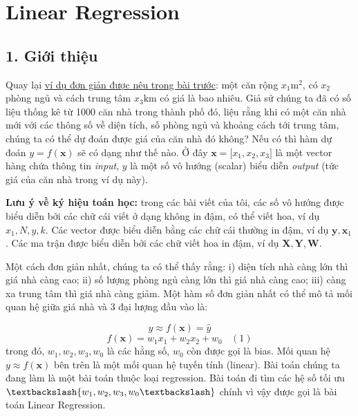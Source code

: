 \chapter{Linear Regression}
\label{cha:linearregression}

\section{1. Giới thiệu}\label{giux1edbi-thiux1ec7u}

Quay lại \href{/2016/12/27/categories/\#regression}{ví dụ đơn giản được
nêu trong bài trước}: một căn rộng $x_1 \text{m}^2$, có
$x_2$ phòng ngủ và cách trung tâm $ x_3 \text{km}$ có
giá là bao nhiêu. Giả sử chúng ta đã có số liệu thống kê từ 1000 căn nhà
trong thành phố đó, liệu rằng khi có một căn nhà mới với các thông số về
diện tích, số phòng ngủ và khoảng cách tới trung tâm, chúng ta có thể dự
đoán được giá của căn nhà đó không? Nếu có thì hàm dự đoán
$y = f(\mathbf{x}) $ sẽ có dạng như thế
nào. Ở đây $\mathbf{x} = {[}x_1, x_2, x_3{]}
$ là một vector hàng chứa thông tin \emph{input},
$y$ là một số vô hướng (scalar) biểu
diễn \emph{output} (tức giá của căn nhà trong ví dụ này).

\textbf{Lưu ý về ký hiệu toán học:} trong các bài viết của tôi, các số
vô hướng được biểu diễn bởi các chữ cái viết ở dạng không in đậm, có thể
viết hoa, ví dụ $x_1, N, y, k$. Các
vector được biểu diễn bằng các chữ cái thường in đậm, ví dụ
$\mathbf{y}, \mathbf{x}_1 $. Các ma
trận được biểu diễn bởi các chữ viết hoa in đậm, ví dụ
$\mathbf{X, Y, W} $.

Một cách đơn giản nhất, chúng ta có thể thấy rằng: i) diện tích nhà càng
lớn thì giá nhà càng cao; ii) số lượng phòng ngủ càng lớn thì giá nhà
càng cao; iii) càng xa trung tâm thì giá nhà càng giảm. Một hàm số đơn
giản nhất có thể mô tả mối quan hệ giữa giá nhà và 3 đại lượng đầu vào
là:

\begin{equation}y \approx  f(\mathbf{x}) = \hat{y}\end{equation}
\begin{equation}f(\mathbf{x}) =w_1 x_1 + w_2 x_2 + w_0~~~~
(1)\end{equation} trong đó, $w_1, w_2, w_3,
w_0$ là các hằng số,
$w_0$ còn được gọi là bias. Mối quan hệ
$y \approx f(\mathbf{x})$ bên trên là
một mối quan hệ tuyến tính (linear). Bài toán chúng ta đang làm là một
bài toán thuộc loại regression. Bài toán đi tìm các hệ số tối ưu
$ \textbackslash\{w_1, w_2, w_3, w_0
\textbackslash\}$ chính vì vậy được gọi là bài toán
Linear Regression.

